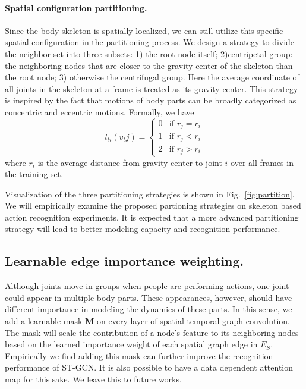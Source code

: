 \documentclass[letterpaper]{article} %
\begin{document}
\paragraph{Spatial configuration partitioning.}
Since the body skeleton is spatially localized, we can still utilize this specific spatial configuration in the partitioning process.
We design a strategy to divide the neighbor set into three subsets:
1) the root node itself; 2)centripetal group: the neighboring nodes that are closer to the gravity center of the skeleton than the root node; 3) otherwise the centrifugal group.
Here the average coordinate of all joints in the skeleton at a frame is treated as its gravity center.
This strategy is inspired by the fact that motions of body parts can be broadly categorized as concentric and eccentric motions. Formally, we have
\begin{equation}
l_{ti}({v_tj})=
	\begin{cases}
	   0 &\mbox{if $r_{j} = r_{i}$}\\
	   1 &\mbox{if $r_{j} < r_{i}$}\\
	   2 &\mbox{if $r_{j} > r_{i}$}
	\end{cases}
\end{equation}
where $r_i$ is the average distance from gravity center to joint $i$ over all frames in the training set.

Visualization of the three partitioning strategies is shown in Fig.~\ref{fig:partition}. We will empirically examine the proposed partioning strategies on skeleton based action recognition experiments.
It is expected that a more advanced partitioning strategy will lead to better modeling capacity and recognition performance.



\subsection{Learnable edge importance weighting.}
Although joints move in groups when people are performing actions, one joint could appear in multiple body parts. These appearances, however, should have different importance in modeling the dynamics of these parts.
In this sense, we add a learnable mask $ \mathbf{M} $ on every layer of spatial temporal graph convolution.
The mask will scale the contribution of a node's feature to its neighboring nodes based on the learned importance weight of each spatial graph edge in $ E_S $.
Empirically we find adding this mask can further improve the recognition performance of ST-GCN.
It is also possible to have a data dependent attention map for this sake. We leave this to future works.
\end{document}
